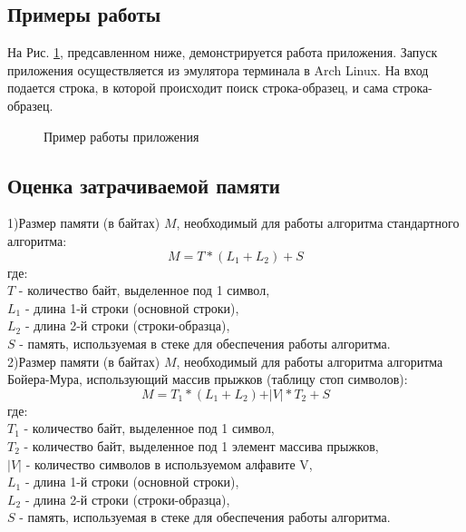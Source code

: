 \documentclass[a4paper,12pt]{article}
\begin{document}
\newpage
\subsection{Примеры работы}
На Рис. \ref{images:example}, предсавленном ниже, демонстрируется работа приложения. Запуск приложения осуществляется из эмулятора терминала в Arch Linux. На вход подается 
строка, в которой происходит поиск строка-образец, и сама строка-образец.
\begin{figure}[h]
\caption{Пример работы приложения}
\label{images:example}
\end{figure}

\newpage
\subsection{Оценка затрачиваемой памяти}
1)Размер памяти (в байтах) $M$, необходимый для работы алгоритма стандартного алгоритма:\\
\begin{equation}
M =  T * (L_1 + L_2) + S
\end{equation}
где:\\
$T$ - количество байт, выделенное под 1 символ,\\
$L_1$ - длина 1-й строки (основной строки),\\
$L_2$ - длина 2-й строки (строки-образца),\\
$S$ - память, используемая в стеке для обеспечения работы алгоритма. \\

2)Размер памяти (в байтах) $M$, необходимый для работы алгоритма алгоритма Бойера-Мура, использующий массив прыжков (таблицу стоп символов):\\
\begin{equation}
M = T_1 * (L_1 + L_2) + \vert V \vert * T_2 + S
\end{equation} 
где:\\
$T_1$ - количество байт, выделенное под 1 символ,\\
$T_2$ - количество байт, выделенное под 1 элемент массива прыжков,\\
$\vert V \vert$ - количество символов в используемом алфавите V,\\
$L_1$ - длина 1-й строки (основной строки),\\
$L_2$ - длина 2-й строки (строки-образца),\\
$S$ - память, используемая в стеке для обеспечения работы алгоритма. \\
\end{document}
